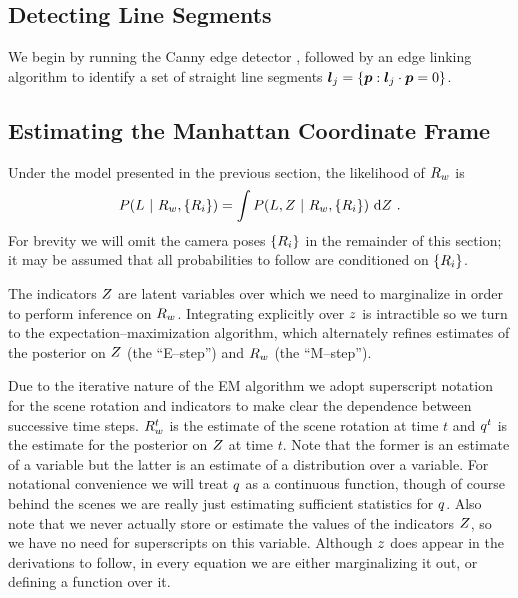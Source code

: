 \subsection{Detecting Line Segments}

We begin by running the Canny edge detector \cite{Canny86}, followed
by an edge linking algorithm \cite{Zhang02} to identify a set of
straight line segments $\LineSeg_j = \{\Pixel : \LineSeg_j\cdot\Pixel
= 0\}$.

\subsection{Estimating the Manhattan Coordinate Frame}

Under the model presented in the previous section, the
likelihood of $\SceneR$ is
\begin{equation}
  P(\LineSegs ~|~ \SceneR,\{\CamR_i\}) =
    \int P(\LineSegs,\Indicators ~|~ \SceneR,\{\CamR_i\})
    ~\intd\Indicators ~.
\end{equation}
For brevity we will omit the camera poses $\{\CamR_i\}$ in the
remainder of this section; it may be assumed that all probabilities
to follow are conditioned on $\{\CamR_i\}$.

The indicators $\Indicators$ are latent variables over which we need
to marginalize in order to perform inference on $\SceneR$. Integrating
explicitly over $\Indicator$ is intractible so we turn to the
expectation--maximization algorithm, which alternately refines
estimates of the posterior on $\Indicators$ (the ``E--step'') and
$\SceneR$ (the ``M--step'').

Due to the iterative nature of the EM algorithm we adopt superscript
notation for the scene rotation and indicators to make clear the
dependence between successive time steps. $\SceneR^t$ is the estimate
of the scene rotation at time $t$ and $\PosteriorEst^t$ is the
estimate for the posterior on $\Indicators$ at time $t$. Note that the
former is an estimate of a variable but the latter is an estimate of a
distribution over a variable. For notational convenience we will treat
$\PosteriorEst$ as a continuous function, though of course behind the
scenes we are really just estimating sufficient statistics for
$\PosteriorEst$. Also note that we never actually store or estimate
the values of the indicators $\Indicators$, so we have no need for
superscripts on this variable. Although $\Indicator$ does appear in
the derivations to follow, in every equation we are either
marginalizing it out, or defining a function over it.

